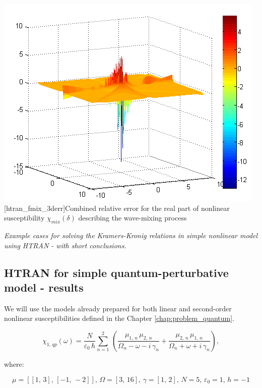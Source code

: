 \documentclass[12pt,twoside,a4paper]{article}
\numberwithin{equation}{subsection}
\numberwithin{figure}{subsection}
\begin{document}
\begin{center}
  \includegraphics{img/htran_fmix_3derr.png}
  [htran_fmix_3derr]{Combined relative error for the real part of nonlinear susceptibility ${\chi_{mix}}(\delta
  )$ describing the wave-mixing process}
  \label{fig:htran_fmix_3derr}
\end{center}

\textit{Example cases for solving the Kramers-Kronig relations in simple nonlinear model using HTRAN - with short conclusions.}

\subsection{HTRAN for simple quantum-perturbative model - results} \label{chap:htran_quantum}

We will use the models already prepared for both linear and second-order nonlinear susceptibilities defined
in the Chapter \ref{chap:problem_quantum}.

\begin{equation} \label{eq:htran_qpeq}
  \chi_{1, \,qp}(\omega ) = 
  \frac{N}{\varepsilon_0\,\hbar} \sum_{n=1}^{2}\,(\frac {{\mu_{1, \,n}}\,{\mu_{2, \,n}}}{{\Omega_{n}} - \omega -
  i\,{\gamma_{n}}} + \frac {{\mu_{2, \,n}}\,{\mu_{1, \,n}}}{{\Omega_{n}} + \omega + i\,{\gamma_{n}}}),
\end{equation}

where:

\begin{equation*}
  \mu = [[1, \,3], \,[ -1, \, -2]],\,\Omega =[3, \,16],\,\gamma =[1, \,2],\,N=5,\,\varepsilon_{0}=1, \,h= - 1
\end{equation*}
\end{document}
